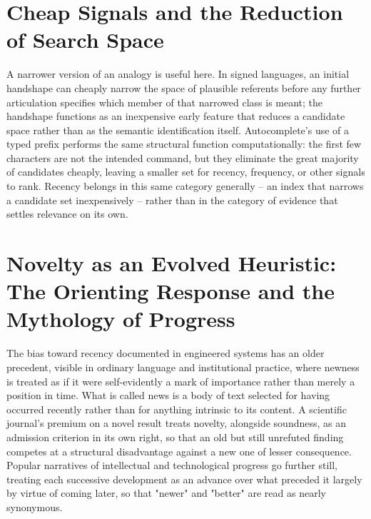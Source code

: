 \documentclass[11pt]{article}
\begin{document}
\section{Cheap Signals and the Reduction of Search Space}

A narrower version of an analogy is useful here. In signed languages, an initial handshape can cheaply narrow the space of plausible referents before any further articulation specifies which member of that narrowed class is meant; the handshape functions as an inexpensive early feature that reduces a candidate space rather than as the semantic identification itself. Autocomplete's use of a typed prefix performs the same structural function computationally: the first few characters are not the intended command, but they eliminate the great majority of candidates cheaply, leaving a smaller set for recency, frequency, or other signals to rank. Recency belongs in this same category generally -- an index that narrows a candidate set inexpensively -- rather than in the category of evidence that settles relevance on its own.

\section{Novelty as an Evolved Heuristic: The Orienting Response and the Mythology of Progress}

The bias toward recency documented in engineered systems has an older precedent, visible in ordinary language and institutional practice, where newness is treated as if it were self-evidently a mark of importance rather than merely a position in time. What is called news is a body of text selected for having occurred recently rather than for anything intrinsic to its content. A scientific journal's premium on a novel result treats novelty, alongside soundness, as an admission criterion in its own right, so that an old but still unrefuted finding competes at a structural disadvantage against a new one of lesser consequence. Popular narratives of intellectual and technological progress go further still, treating each successive development as an advance over what preceded it largely by virtue of coming later, so that "newer" and "better" are read as nearly synonymous.
\end{document}
